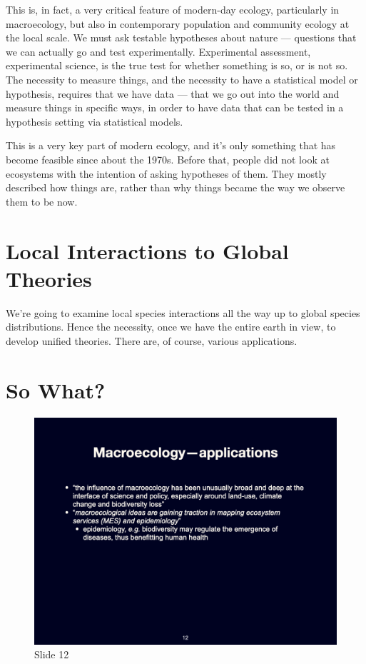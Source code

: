 \documentclass[
  12pt,
]{book}
\begin{document}
This is, in fact, a very critical feature of modern-day ecology,
particularly in macroecology, but also in contemporary population and
community ecology at the local scale. We must ask testable hypotheses
about nature --- questions that we can actually go and test
experimentally. Experimental assessment, experimental science, is the
true test for whether something is so, or is not so. The necessity to
measure things, and the necessity to have a statistical model or
hypothesis, requires that we have data --- that we go out into the world
and measure things in specific ways, in order to have data that can be
tested in a hypothesis setting via statistical models.

This is a very key part of modern ecology, and it's only something that
has become feasible since about the 1970s. Before that, people did not
look at ecosystems with the intention of asking hypotheses of them. They
mostly described how things are, rather than why things became the way
we observe them to be now.

\section{Local Interactions to Global
Theories}\label{local-interactions-to-global-theories}

We're going to examine local species interactions all the way up to
global species distributions. Hence the necessity, once we have the
entire earth in view, to develop unified theories. There are, of course,
various applications.

\section{So What?}\label{so-what}

\begin{figure}[ht]
\centering
\includegraphics[width=0.8\linewidth]{../images/BDC334/BDC334-012.jpeg}
\caption*{Slide 12}
\end{figure}
\end{document}

